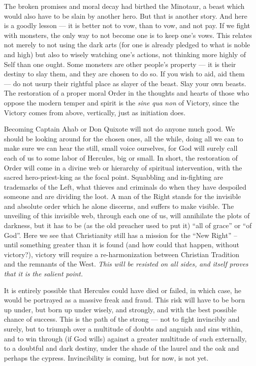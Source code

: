 The broken promises and moral decay had birthed the Minotaur, a beast which would also have to be slain by another hero. But that is another story. And here is a goodly lesson --- it is better not to vow, than to vow, and not pay. If we fight with monsters, the only way to not become one is to keep one's vows. This relates not merely to not using the dark arts (for one is already pledged to what is noble and high) but also to wisely watching one's actions, not thinking more highly of Self than one ought. Some monsters are other people's property --- it is their destiny to slay them, and they are chosen to do so. If you wish to aid, aid them --- do not usurp their rightful place as slayer of the beast. Slay your own beasts. The restoration of a proper moral Order in the thoughts and hearts of those who oppose the modern temper and spirit is the \emph{sine qua non} of Victory, since the Victory comes from above, vertically, just as initiation does.

Becoming Captain Ahab or Don Quixote will not do anyone much good. We should be looking around for the chosen ones, all the while, doing all we can to make sure we can hear the still, small voice ourselves, for God will surely call each of us to some labor of Hercules, big or small. In short, the restoration of Order will come in a divine web or hierarchy of spiritual intervention, with the sacred hero-priest-king as the focal point. Squabbling and in-fighting are trademarks of the Left, what thieves and criminals do when they have despoiled someone and are dividing the loot. A man of the Right stands for the invisible and absolute order which he alone discerns, and suffers to make visible. The unveiling of this invisible web, through each one of us, will annihilate the plots of darkness, but it has to be (as the old preacher used to put it) ``all of grace'' or ``of God''. Here we see that Christianity still has a mission for the ``New Right'' -- until something greater than it is found (and how could that happen, without victory?), victory will require a re-harmonization between Christian Tradition and the remnants of the West. \emph{This will be resisted on all sides, and itself proves that it is the salient point.}

It is entirely possible that Hercules could have died or failed, in which case, he would be portrayed as a massive freak and fraud. This risk will have to be born up under, but born up under wisely, and strongly, and with the best possible chance of success. This is the path of the strong --- not to fight invincibly and surely, but to triumph over a multitude of doubts and anguish and sins within, and to win through (if God wills) against a greater multitude of such externally, to a doubtful and dark destiny, under the shade of the laurel and the oak and perhaps the cypress. Invincibility is coming, but for now, is not yet.

